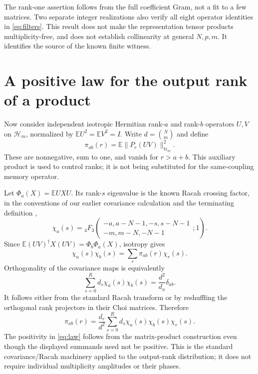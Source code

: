 \documentclass[11pt,a4paper]{article}
\newcommand{\EE}{\mathbb E}
\DeclareMathOperator{\tr}{tr}
\begin{document}
The rank-one assertion follows from the full coefficient Gram,
not a fit to a few matrices. Two separate integer realizations
also verify all eight operator identities in \eqref{eq:filters}.
This result does not make the representation tensor products
multiplicity-free, and does not establish collinearity at general
$N,p,m$. It identifies the source of the known finite witness.

\newpage
\section{A positive law for the output rank of a product}
Now consider independent isotropic Hermitian rank-$a$ and rank-$b$
operators $U,V$ on $\mathcal H_m$, normalized by
$\EE U^2=\EE V^2=I$. Write $d=\binom Nm$ and define
\begin{equation}
 \pi_{ab}(r)=\EE\|P_r(UV)\|_{\tr_m}^2.
\end{equation}
These are nonnegative, sum to one, and vanish for $r>a+b$.
This auxiliary product is used to control ranks; it is not being
substituted for the same-coupling memory operator.

Let $\Phi_a(X)=\EE UXU$. Its rank-$s$ eigenvalue is the known
Racah crossing factor, in the conventions of our earlier covariance
calculation and the terminating definition \cite{DLMF},
\begin{equation}
 \chi_a(s)={}_4F_3\!\left(\begin{matrix}-a,a-N-1,-s,s-N-1\\
                                  -m,m-N,-N-1\end{matrix};1\right).
 \label{eq:chi}
\end{equation}
Since $\EE (UV)^\dagger X(UV)=\Phi_b\Phi_a(X)$, isotropy gives
\begin{equation}
 \chi_a(s)\chi_b(s)=\sum_r\pi_{ab}(r)\chi_r(s).
 \label{eq:composition}
\end{equation}
Orthogonality of the covariance maps is equivalently
\begin{equation}
 \sum_{s=0}^R d_s\chi_a(s)\chi_b(s)=\frac{d^2}{d_a}\delta_{ab}.
\end{equation}
It follows either from the standard Racah transform or by reshuffling
the orthogonal rank projectors in their Choi matrices. Therefore
\begin{equation}
 \boxed{\pi_{ab}(r)=\frac{d_r}{d^2}
       \sum_{s=0}^R d_s\chi_a(s)\chi_b(s)\chi_r(s).}
 \label{eq:law}
\end{equation}
The positivity in \eqref{eq:law} follows from the matrix-product
construction even though the displayed summands need not be positive.
This is the standard covariance/Racah machinery applied to the
output-rank distribution; it does not require individual multiplicity
amplitudes or their phases.
\end{document}
